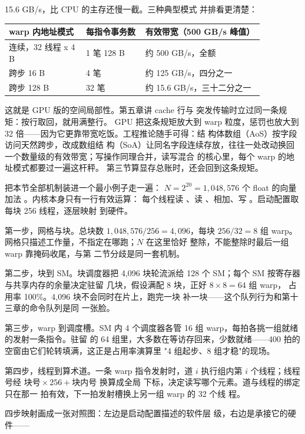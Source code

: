 15.6 GB/s，比 CPU 的主存还慢一截。三种典型模式
并排看更清楚：

\begin{longtable}{L{0.26\linewidth}L{0.2\linewidth}L{0.4\linewidth}}
\toprule
warp 内地址模式 & 每指令事务数 & 有效带宽（500 GB/s 峰值） \\
\midrule
连续，32 线程 x 4 B & 1 笔 128 B & 约 500 GB/s，全额 \\
跨步 16 B & 4 笔 & 约 125 GB/s，四分之一 \\
跨步 128 B & 32 笔 & 约 15.6 GB/s，三十二分之一 \\
\bottomrule
\end{longtable}

这就是 GPU 版的空间局部性。第五章讲 cache 行与
突发传输时立过同一条规矩：按行取回，就用满整行。
GPU 把这条规矩放大到 warp 粒度，惩罚也放大到 32
倍——因为它更靠带宽吃饭。工程推论随手可得：结
构体数组（AoS）按字段访问天然跨步，改成数组结
构（SoA）让同名字段连续存放，往往一处改动换回
一个数量级的有效带宽；写操作同理合并，读写混合
的核心里，每个 warp 的地址模式都要过一遍这杆秤。
第三节算显存总账时，还会回到这条规矩。

把本节全部机制装进一个最小例子走一遍：
$N=2^{20}=1,048,576$ 个 float 的向量加法
。内核本身只有一行有效运算：
每个线程读 、读 、相加、写
。启动配置取每块 256 线程，逐层映射
到硬件。

第一步，网格与块。总块数
$1,048,576/256=4,096$，每块 $256/32=8$ 组 warp。
网格只描述工作量，不指定在哪跑；$N$ 在这里恰好
整除，不能整除时最后一组 warp 靠掩码收尾，与第
二节分歧是同一套机制。

第二步，块到 SM。块调度器把 4,096 块轮流派给 128
个 SM；每个 SM 按寄存器与共享内存的余量决定驻留
几块，假设满配 8 块，正好 $8\times8=64$ 组 warp，
占用率 100\%。4,096 块不会同时在片上，跑完一块
补一块——这个队列行为和第十三章的命令队列是同
一张脸。

第三步，warp 到调度槽。SM 内 4 个调度器各管 16
组 warp，每拍各挑一组就绪的发射一条指令。驻留
的 64 组里，大多数在等访存回来，少数就绪——400
拍的空窗由它们轮转填满，这正是占用率演算里
"4 组起步、8 组才稳"的现场。

第四步，线程到算术道。一条 warp 指令发射时，道
$i$ 执行组内第 $i$ 个线程；线程号经
$\text{块号}\times256+\text{块内号}$ 换算成全局
下标，决定读写哪个元素。道与线程的绑定只在那一
拍有效，下一拍发射槽换上另一组 warp 的 32 个线
程。

四步映射画成一张对照图：左边是启动配置描述的软件层
级，右边是承接它的硬件——

